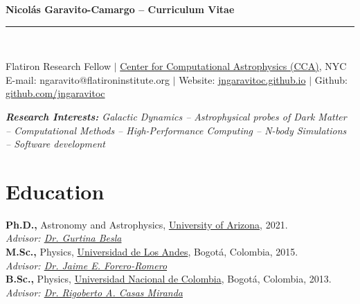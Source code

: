 \documentclass[UTF8]{article}
\begin{document}
\begin{center}
\indent \textbf{\LARGE Nicol\'as Garavito-Camargo -- Curriculum Vitae} \\
\indent \rule{17cm}{0.4pt}\\
\end{center}



\begin{center}
  Flatiron Research Fellow $|$ \href{https://www.simonsfoundation.org/flatiron/center-for-computational-astrophysics/} {Center for Computational Astrophysics
(CCA)}, NYC\\
E-mail: ngaravito@flatironinstitute.org $|$ Website:
\href{http://jngaravitoc.github.io/Garavito-Camargo}{jngaravitoc.github.io} $|$ Github: \href{http://www.github.com/jngaravitoc}{github.com/jngaravitoc}\\
\end{center}

\begin{center}
\textit{\textbf{Research Interests:} Galactic Dynamics -- Astrophysical probes
  of Dark Matter -- Computational Methods -- High-Performance Computing --
N-body Simulations -- Software development}\\
\end{center}




\section*{Education}
\textbf{Ph.D.,} Astronomy and Astrophysics, \href{https://www.as.arizona.edu/}{University of Arizona}, 2021.\\
\indent \textit{Advisor: \href{https://sites.google.com/view/thebeslagroup/home}{Dr. Gurtina Besla}}\\
\textbf{M.Sc.,}  Physics, \href{https://fisica.uniandes.edu.co/en}{Universidad de Los Andes}, Bogot\'a, Colombia, 2015.\\
\indent \textit{Advisor: \href{http://wwwprof.uniandes.edu.co/~je.forero/}{Dr. Jaime E. Forero-Romero}}\\
\textbf{B.Sc.,} Physics,
\href{https://unal.edu.co/en.html}{Universidad Nacional de Colombia}, Bogot\'a, Colombia, 2013.\\
\indent \textit{Advisor:
\href{https://www.iau.org/administration/membership/individual/16146/}{Dr.
Rigoberto A. Casas Miranda}}
\end{document}
